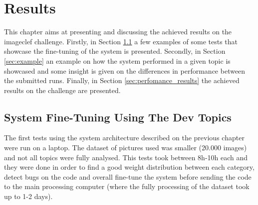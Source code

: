 \cleardoublepage
\chapter{Results}
\label{ch:results}

This chapter aims at presenting and discussing the achieved results on the imageclef challenge. Firstly, in Section \ref{sec:first} a few examples of some tests that showcase the fine-tuning of the system is presented. Secondly, in Section \ref{sec:example} an example on how the system performed in a given topic is showcased and some insight is given on the differences in performance between the submitted runs. Finally, in Section \ref{sec:perfomance_results} the achieved results on the challenge are presented.

\section{System Fine-Tuning Using The Dev Topics}
\label{sec:first}

The first tests using the system architecture described on the previous chapter were run on a laptop. The dataset of pictures used was smaller (20.000 images) and not all topics were fully analysed. This tests took between 8h-10h each and they were done in order to find a good weight distribution between each category, detect bugs on the code and overall fine-tune the system before sending the code to the main processing computer (where the fully processing of the dataset took up to 1-2 days).

